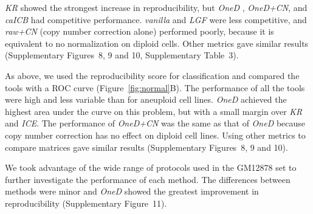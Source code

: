\documentclass[a4,center,fleqn]{NAR}
\providecommand{\DIFadd}[1]{{\protect\color{red}#1}} %
\providecommand{\DIFdel}[1]{{\protect}}                      %
\providecommand{\DIFaddbegin}{} %
\providecommand{\DIFaddend}{} %
\providecommand{\DIFdelbegin}{} %
\providecommand{\DIFdelend}{} %
\begin{document}
\DIFdelend \DIFaddbegin \textit{\DIFadd{KR}} \DIFadd{showed the strongest increase in reproducibility, but
}\DIFaddend \textit{OneD}\DIFdelbegin \DIFdel{decreased the similarity between different cell types when
using the same protocol and
increased it between identical cell types when
using different protocols. In the other two cases, it had little effect. In summary, }\textit{\DIFdel{OneD}} %
\DIFdel{never enhanced the experimental noise and even
reduced it in one more case than }\DIFdelend \DIFaddbegin \DIFadd{, }\textit{\DIFadd{OneD+CN}}\DIFadd{, and }\textit{\DIFadd{caICB}} \DIFadd{had competitive
performance. }\textit{\DIFadd{vanilla}} \DIFadd{and }\DIFaddend \textit{LGF} \DIFaddbegin \DIFadd{were less competitive, and
}\textit{\DIFadd{raw+CN}} \DIFadd{(copy number correction alone) performed poorly, because
it is equivalent to no normalization on diploid cells. Other metrics gave
similar results (Supplementary Figures~8, 9 and 10, Supplementary Table~3)}\DIFaddend .

\DIFdelbegin \DIFdel{When interpreting the similarity scores as classification scores, we observed that all the methods could identify approximately 50\% of the biological pairs, after which their performance diverged
}\DIFdelend \DIFaddbegin \DIFadd{As above, we used the reproducibility score for classification and
compared the tools with a ROC curve }\DIFaddend (Figure~\ref{fig:normal}B). \DIFaddbegin \DIFadd{The
performance of all the tools were high and less variable than for
aneuploid cell lines. }\DIFaddend \textit{OneD} achieved the highest area under the
curve on this problem, but with a small margin over \DIFdelbegin \DIFdel{the other methods
except }\DIFdelend \DIFaddbegin \textit{\DIFadd{KR}} \DIFadd{and
}\textit{\DIFadd{ICE}}\DIFadd{. The performance of }\textit{\DIFadd{OneD+CN}} \DIFadd{was the same as that of
}\DIFaddend \textit{\DIFdelbegin \DIFdel{vanilla}\DIFdelend \DIFaddbegin \DIFadd{OneD}\DIFaddend } \DIFaddbegin \DIFadd{because copy number correction has no effect on diploid cell
lines}\DIFaddend . Using other metrics to compare matrices gave similar results
\DIFdelbegin \DIFdel{: }\textit{\DIFdel{OneD}} %
\DIFdel{was always among the top scoring methods
}\DIFdelend (Supplementary Figures\DIFdelbegin \DIFdel{7 and }\DIFdelend \DIFaddbegin \DIFadd{~}\DIFaddend 8\DIFaddbegin \DIFadd{, 9 and 10).
}

\DIFadd{We took advantage of the wide range of protocols used in the GM12878 set to
further investigate the performance of each method. The differences between
methods were minor and }\textit{\DIFadd{OneD}} \DIFadd{showed the greatest improvement in
reproducibility (Supplementary Figure~11}\DIFaddend ).
\DIFdelbegin \DIFdel{In these conditions, Spearman correlation
of contacts again appeared as the worst comparison metric because it
showed a lower performance for all the normalization methods .
}\DIFdelend 
\end{document}
